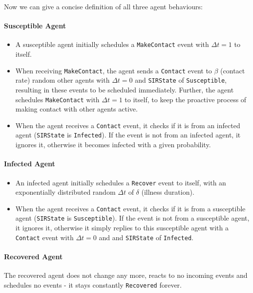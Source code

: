 Now we can give a concise definition of all three agent behaviours:

\paragraph{Susceptible Agent}
\begin{itemize}
	\item A susceptible agent initially schedules a \texttt{MakeContact} event with $\Delta t = 1$ to itself.
	\item When receiving \texttt{MakeContact}, the agent sends a \texttt{Contact} event to $\beta$ (contact rate) random other agents with $\Delta t = 0$ and \texttt{SIRState} of \texttt{Susceptible}, resulting in these events to be scheduled immediately. Further, the agent schedules \texttt{MakeContact} with $\Delta t = 1$ to itself, to keep the proactive process of making contact with other agents active.
	\item When the agent receives a \texttt{Contact} event, it checks if it is from an infected agent (\texttt{SIRState} is \texttt{Infected}). If the event is not from an infected agent, it ignores it, otherwise it becomes infected with a given probability.
\end{itemize}

\paragraph{Infected Agent}
\begin{itemize}
	\item An infected agent initially schedules a \texttt{Recover} event to itself, with an exponentially distributed random $\Delta t$ of $\delta$ (illness duration).
	\item When the agent receives a \texttt{Contact} event, it checks if it is from a susceptible agent (\texttt{SIRState} is \texttt{Susceptible}). If the event is not from a susceptible agent, it ignores it, otherwise it simply replies to this susceptible agent with a \texttt{Contact} event with $\Delta t = 0$ and and \texttt{SIRState} of \texttt{Infected}.
\end{itemize}

\paragraph{Recovered Agent}
The recovered agent does not change any more, reacts to no incoming events and schedules no events - it stays constantly \texttt{Recovered} forever.

